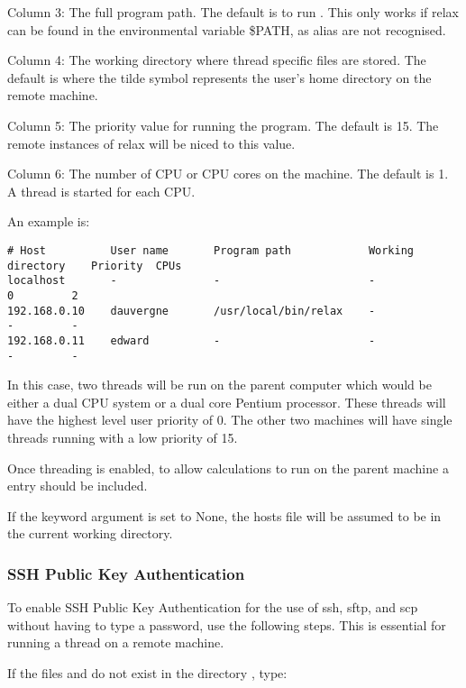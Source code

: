 Column 3:  The full program path.  The default is to run 
.  This only works if relax
can be found in the environmental variable \$PATH, as alias are not recognised.

Column 4:  The working directory where thread specific files are stored.  The default is
 where the tilde 
 symbol represents the user's home directory on the remote
machine.

Column 5:  The priority value for running the program.  The default is 15.  The remote
instances of relax will be niced to this value.

Column 6:  The number of CPU or CPU cores on the machine.  The default is 1.  A thread is
started for each CPU.

An example is:

{\footnotesize \begin{verbatim}
# Host          User name       Program path            Working directory    Priority  CPUs
localhost       -               -                       -                    0         2
192.168.0.10    dauvergne       /usr/local/bin/relax    -                    -         -
192.168.0.11    edward          -                       -                    -         -
\end{verbatim}}

In this case, two threads will be run on the parent computer which would be either a dual
CPU system or a dual core 
 Pentium processor.  These threads will have the
highest level user priority of 0.  The other two machines will have single threads running
with a low priority of 15.

Once threading is enabled, to allow calculations to run on the parent machine a 
entry should be included.


If the keyword argument 
 is set to None, the hosts file will be assumed to be in the
current working directory.


\subsubsection{SSH Public Key Authentication}

To enable SSH Public Key Authentication for the use of ssh, sftp, and scp without having to
type a password, use the following steps.  This is essential for running a thread on a
remote machine.

If the files 
 and 
 do not exist in the directory 
, type:

